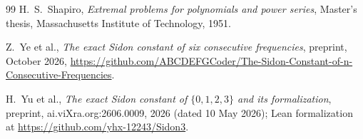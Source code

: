 \documentclass[11pt]{amsart}
\theoremstyle{remark}
\numberwithin{equation}{section}
\begin{document}
\begin{thebibliography}{99}
 H.~S.~Shapiro, \emph{Extremal problems for polynomials and power series}, Master's thesis, Massachusetts Institute of Technology, 1951.

 Z.~Ye et al., \emph{The exact Sidon constant of six consecutive frequencies}, preprint, October 2026, \url{https://github.com/ABCDEFGCoder/The-Sidon-Constant-of-n-Consecutive-Frequencies}.

 H.~Yu et al., \emph{The exact Sidon constant of $\{0,1,2,3\}$ and its formalization}, preprint, ai.viXra.org:2606.0009, 2026 (dated 10 May 2026); Lean formalization at \url{https://github.com/yhx-12243/Sidon3}.

\end{thebibliography}
\end{document}
